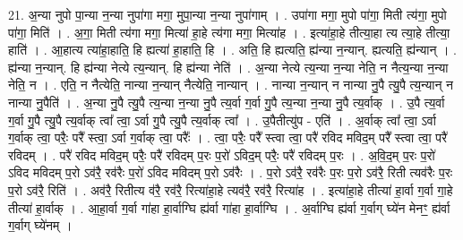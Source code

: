 \documentclass[17pt]{extarticle}
\begin{document}
21. अ॒न्या नुपो पा॒न्या न॒न्या नुपा॑गा मगा॒ मुपा॒न्या न॒न्या नुपा॑गाम् । . उपा॑गा मगा॒ मुपो पा॑गा॒ मिती त्य॑गा॒ मुपो पा॑गा॒ मिति॑ । . अ॒गा॒ मिती त्य॑गा मगा॒ मित्या॑ हा॒हे त्य॑गा मगा॒ मित्या॑ह । . इत्या॑हा॒हे तीत्या॒हा त्य त्या॒हे तीत्या॒ हाति॑ । . आ॒हात्य त्या॑हा॒हाति॒ हि ह्यत्या॑ हा॒हाति॒ हि । . अति॒ हि ह्यत्यति॒ ह्य॑न्या न॒न्यान्. ह्यत्यति॒ ह्य॑न्यान् । . ह्य॑न्या न॒न्यान्. हि ह्य॑न्या नेत्ये त्य॒न्यान्. हि ह्य॑न्या नेति॑ । . अ॒न्या नेत्ये त्य॒न्या न॒न्या नेति॒ न नैत्य॒न्या न॒न्या नेति॒ न । . एति॒ न नैत्येति॒ नान्या न॒न्यान् नैत्येति॒ नान्यान् । . नान्या न॒न्यान् न नान्या नु॒पै त्यु॒पै त्य॒न्यान् न नान्या नु॒पैति॑ । . अ॒न्या नु॒पै त्यु॒पै त्य॒न्या न॒न्या नु॒पै त्य॒र्वा ग॒र्वा गु॒पै त्य॒न्या न॒न्या नु॒पै त्य॒र्वाक् । . उ॒पै त्य॒र्वा ग॒र्वा गु॒पै त्यु॒पै त्य॒र्वाक् त्वा᳚ त्वा॒ ऽर्वा गु॒पै त्यु॒पै त्य॒र्वाक् त्वा᳚ । . उ॒पैतीत्यु॑प - एति॑ । . अ॒र्वाक् त्वा᳚ त्वा॒ ऽर्वा ग॒र्वाक् त्वा॒ परैः॒ परै᳚ स्त्वा॒ ऽर्वा ग॒र्वाक् त्वा॒ परैः᳚ । . त्वा॒ परैः॒ परै᳚ स्त्वा त्वा॒ परै॑ रविद मविद॒म् परै᳚ स्त्वा त्वा॒ परै॑ रविदम् । . परै॑ रविद मविद॒म् परैः॒ परै॑ रविदम् प॒रः प॒रो॑ ऽविद॒म् परैः॒ परै॑ रविदम् प॒रः । . अ॒वि॒द॒म् प॒रः प॒रो॑ ऽविद मविदम् प॒रो ऽव॑रै॒ रव॑रैः प॒रो॑ ऽविद मविदम् प॒रो ऽव॑रैः । . प॒रो ऽव॑रै॒ रव॑रैः प॒रः प॒रो ऽव॑रै॒ रिती त्यव॑रैः प॒रः प॒रो ऽव॑रै॒ रिति॑ । . अव॑रै॒ रितीत्य व॑रै॒ रव॑रै॒ रित्या॑हा॒हे त्यव॑रै॒ रव॑रै॒ रित्या॑ह । . इत्या॑हा॒हे तीत्या॑ हा॒र्वा ग॒र्वा गा॒हे तीत्या॑ हा॒र्वाक् । . आ॒हा॒र्वा ग॒र्वा गा॑हा हा॒र्वाग्घि ह्य॑र्वा गा॑हा हा॒र्वाग्घि । . अ॒र्वाग्घि ह्य॑र्वा ग॒र्वाग् घ्ये॑न मेनꣳ॒॒ ह्य॑र्वा ग॒र्वाग् घ्ये॑नम् । \newline
\end{document}
